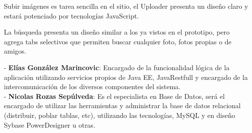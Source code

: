 \documentclass{memoria}
\begin{document}
Subir imágenes es tarea sencilla en el sitio, el Uploader presenta un diseño claro y estará potenciado por tecnologías JavaScript.

\newpage

La búsqueda presenta un diseño similar a los ya vistos en el prototipo, pero agrega tabs selectivos que permiten buscar cualquier foto, fotos propias o de amigos.




- \textbf{Elías González Marincovic}: Encargado de la funcionalidad lógica de la aplicación utilizando servicios propios de Java EE, JavaRestfull y encargado de la intercomunicación de los diversos componentes del sistema.\\

- \textbf{Nicolas Rozas Sepúlveda}: Es el especialista en Base de Datos, será el encargado de utilizar las herramientas y administrar la base de datos relacional (distribuir, poblar tablas, etc), utilizando las tecnologías, MySQL y en diseño Sybase PowerDesigner u otras.\\
\end{document}

